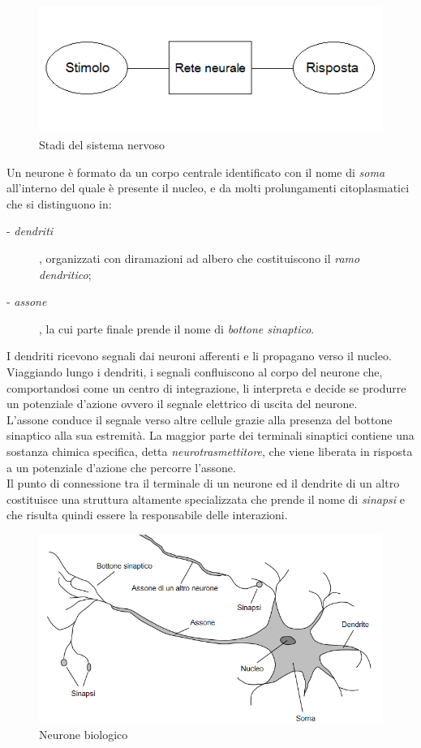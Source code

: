 \documentclass[12pt,a4paper,oneside]{book}
\begin{document}
  		\begin{figure}[h]
  			\centering
  			\includegraphics[width=0.6\linewidth]{IMMAGINI/Sistemanervoso}
  			\caption{Stadi del sistema nervoso}
  			\label{fig: stadi sistema nervoso}
  		\end{figure}
		
		Un neurone è formato da un corpo centrale identificato con il nome di \emph{soma} all'interno del quale è presente il nucleo, e da molti prolungamenti citoplasmatici che si distinguono in:
		 
		 \begin{description}
		 	\item[- \emph{dendriti}], organizzati con diramazioni ad albero che costituiscono il \emph{ramo dendritico};
		 	\item [- \emph{assone}], la cui parte finale prende il nome di \emph{bottone sinaptico}.
		 \end{description}
		 
		I dendriti ricevono segnali dai neuroni afferenti e li propagano verso il nucleo. Viaggiando lungo i dendriti, i segnali confluiscono al corpo del neurone che, comportandosi come un centro di integrazione, li interpreta e decide se produrre un potenziale d'azione ovvero il segnale elettrico di uscita del neurone.\\ 
		L'assone conduce il segnale verso altre cellule grazie alla presenza del bottone sinaptico alla sua estremità.
		La maggior parte dei terminali sinaptici contiene una sostanza chimica specifica, detta \emph{neurotrasmettitore}, che viene liberata in risposta a un potenziale d'azione che percorre l'assone.\\
		Il punto di connessione tra il terminale di un neurone ed il dendrite di un altro costituisce una struttura altamente specializzata che prende il nome di \emph{sinapsi} e che risulta quindi essere la responsabile delle interazioni.\\ 
		 
		  \begin{figure}[h]
		 	\centering
		 	\includegraphics[width=0.7\linewidth]{IMMAGINI/neuron}
		 	\caption{Neurone biologico}
		 	\label{fig:neuron}
		 \end{figure}
		 
\end{document}
